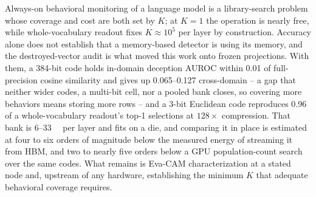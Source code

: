 \documentclass[conference]{IEEEtran}
\newcommand{\auroc}{{AUROC}\xspace}
\begin{document}
Always-on behavioral monitoring of a language model is a
library-search problem whose coverage and cost are both set by $K$;
at $K=1$ the operation is nearly free, while whole-vocabulary readout
fixes $K\!\approx\!10^{5}$ per
layer by construction. Accuracy alone does not establish that a
memory-based detector is using its memory, and the destroyed-vector
audit is what moved this work onto frozen
projections. With them, a 384-bit code holds
in-domain deception \auroc within 0.01 of full-precision cosine
similarity and gives up 0.065--0.127 cross-domain -- a gap that
neither wider codes, a multi-bit cell, nor a pooled bank closes, so
covering more behaviors means storing more rows -- and a 3-bit
Euclidean code reproduces 0.96 of a whole-vocabulary readout's top-1
selections at $128\times$ compression. That bank is
6--\qty{33}{\mega\byte} per layer and fits on a die, and comparing it
in place is estimated at four to six orders of magnitude below the
measured energy of streaming it from HBM, and two to nearly five
orders below a GPU population-count search over the same codes. What
remains is Eva-CAM characterization at a stated node and, upstream of
any hardware, establishing the minimum $K$ that adequate behavioral
coverage requires.



\end{document}
